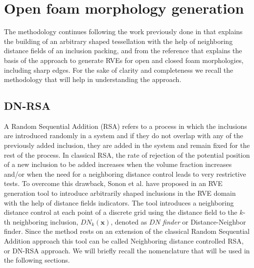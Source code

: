 \section{Open foam morphology generation}\label{of-gen}
The methodology continues following the work previously done in \cite{sononUnifiedLevelSet2012} that explains the building of an arbitrary shaped tessellation with the help of neighboring distance fields of an inclusion packing, and from the reference \cite{sononAdvancedApproachGeneration2015} that explains the basis of the approach to generate RVEs for open and closed foam morphologies, including sharp edges. For the sake of clarity and completeness  we recall the methodology that will help in understanding the approach.

\subsection{DN-RSA}\label{of-gen-dnrsa}
A Random Sequential Addition (RSA) refers to a process in which the inclusions are introduced randomly in a system and if they do not overlap with any of the previously added inclusion, they are added in the system and remain fixed for the rest of the process. In classical RSA, the rate of rejection of the potential position of a new inclusion to be added increases when the volume fraction increases and/or when the need for a neighboring distance control leads to very restrictive tests. To overcome this drawback, Sonon et al. have proposed in \cite{sononUnifiedLevelSet2012} an RVE generation tool to introduce arbitrarily shaped inclusions in the RVE domain with the help of distance fields indicators. The tool introduces a neighboring distance control at each point of a discrete grid using the distance field to the $ k $-th neighboring inclusion, $ DN_k(\textbf{x}) $, denoted as $ DN  $ \textit{finder} or {Distance-Neighbor finder}. Since the method rests on an extension of the classical Random Sequential Addition approach this tool can be called Neighboring distance controlled RSA, or DN-RSA approach. We will briefly recall the nomenclature that will be used in the following sections.

